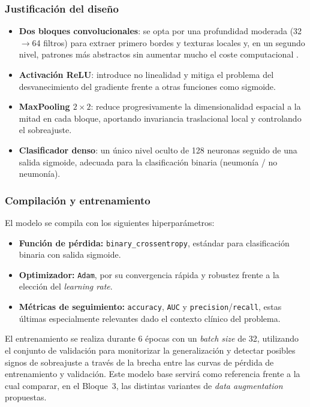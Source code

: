 \documentclass[11pt, a4paper]{article}
\numberwithin{equation}{section}
\begin{document}
\subsubsection*{Justificación del diseño}

\begin{itemize}
    \item \textbf{Dos bloques convolucionales}: se opta por una profundidad moderada (32$\rightarrow$64 filtros) para extraer primero bordes y texturas locales y, en un segundo nivel, patrones más abstractos  sin aumentar mucho el coste computacional .
    \item \textbf{Activación ReLU}: introduce no linealidad y mitiga el problema del desvanecimiento del gradiente frente a otras funciones como sigmoide.
    \item \textbf{MaxPooling $2\times2$}: reduce progresivamente la dimensionalidad espacial a la mitad en cada bloque, aportando invariancia traslacional local y controlando el sobreajuste.
    \item \textbf{Clasificador denso}: un único nivel oculto de 128 neuronas seguido de una salida sigmoide, adecuada para la clasificación binaria (neumonía / no neumonía).
\end{itemize}

\subsubsection*{Compilación y entrenamiento}

El modelo se compila con los siguientes hiperparámetros:

\begin{itemize}
    \item \textbf{Función de pérdida:} \texttt{binary\_crossentropy}, estándar para clasificación binaria con salida sigmoide.
    \item \textbf{Optimizador:} \texttt{Adam}, por su convergencia rápida y robustez frente a la elección del \emph{learning rate}.
    \item \textbf{Métricas de seguimiento:} \texttt{accuracy}, \texttt{AUC} y \texttt{precision}/\texttt{recall}, estas últimas especialmente relevantes dado el contexto clínico del problema.
\end{itemize}

El entrenamiento se realiza durante 6 épocas con un \emph{batch size} de 32, utilizando el conjunto de validación para monitorizar la generalización y detectar posibles signos de sobreajuste a través de la brecha entre las curvas de pérdida de entrenamiento y validación. Este modelo base servirá como referencia frente a la cual comparar, en el Bloque~3, las distintas variantes de \emph{data augmentation} propuestas.
\newpage
\end{document}
